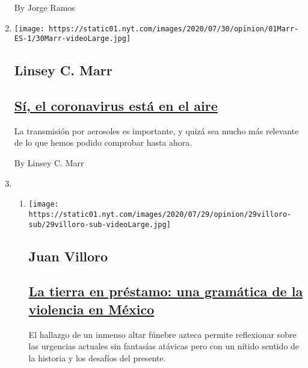 \begin{enumerate}
  By Jorge Ramos
\item
  \texttt{[image: https://static01.nyt.com/images/2020/07/30/opinion/01Marr-ES-1/30Marr-videoLarge.jpg]}

  \hypertarget{linsey-c-marr}{%
  \subsection{Linsey C. Marr}\label{linsey-c-marr}}

  \hypertarget{suxed-el-coronavirus-estuxe1-en-el-aire}{%
  \subsection{\texorpdfstring{\href{/es/2020/08/01/espanol/opinion/coronavirus-aire.html}{Sí,
  el coronavirus está en el
  aire}}{Sí, el coronavirus está en el aire}}\label{suxed-el-coronavirus-estuxe1-en-el-aire}}

  La transmisión por aerosoles es importante, y quizá sea mucho más
  relevante de lo que hemos podido comprobar hasta ahora.

  By Linsey C. Marr
\item
  \begin{enumerate}
  \def\labelenumii{\arabic{enumii}.}
  \item
    \texttt{[image: https://static01.nyt.com/images/2020/07/29/opinion/29villoro-sub/29villoro-sub-videoLarge.jpg]}

    \hypertarget{juan-villoro}{%
    \subsection{Juan Villoro}\label{juan-villoro}}

    \hypertarget{la-tierra-en-pruxe9stamo-una-gramuxe1tica-de-la-violencia-en-muxe9xico}{%
    \subsection{\texorpdfstring{\href{/es/2020/07/30/espanol/opinion/aztecas-violencia-narco-amlo.html}{La
    tierra en préstamo: una gramática de la violencia en
    México}}{La tierra en préstamo: una gramática de la violencia en México}}\label{la-tierra-en-pruxe9stamo-una-gramuxe1tica-de-la-violencia-en-muxe9xico}}

    El hallazgo de un inmenso altar fúnebre azteca permite reflexionar
    sobre las urgencias actuales sin fantasías atávicas pero con un
    nítido sentido de la historia y los desafíos del presente.


\end{enumerate}
\end{enumerate}
